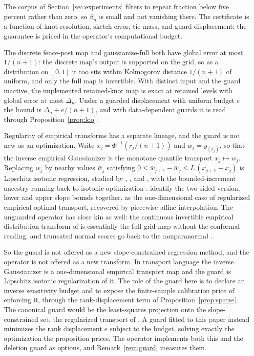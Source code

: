 \documentclass[11pt]{article}
\theoremstyle{remark}
\begin{document}
The corpus of Section~\ref{sec:experiments} filters to repeat fraction below five
percent rather than zero, so $\beta_n$ is small and not vanishing there. The certificate is a function of knot resolution, sketch error, tie mass, and
guard displacement: the guarantee is priced in the operator's computational
budget.

The discrete fence-post map and gaussianize-full both have global error at most
$1/(n+1)$: the discrete map's output is supported on the grid, so as a distribution on
$[0,1]$ it too sits within Kolmogorov distance $1/(n+1)$ of uniform, and only the full
map is invertible. With distinct input and the guard inactive, the implemented retained-knot map is
exact at retained levels with global error at most $\Delta_n$. Under a guarded
displacement with uniform budget $e$ the bound is $\Delta_n + e/(n+1)$, and with
data-dependent guards it is read through Proposition~\ref{prop:loo}.

Regularity of empirical transforms has a separate lineage, and the guard is not new
as an optimization. Write $x_j = \Phi^{-1}(r_j/(n+1))$ and $w_j = y_{(r_j)}$, so
that the inverse empirical Gaussianizer is the monotone quantile transport
$x_j \mapsto w_j$. Replacing $w_j$ by nearby values $\bar w_j$ satisfying
$0 \le \bar w_{j+1} - \bar w_j \le L\,(x_{j+1} - x_j)$ is Lipschitz isotonic
regression, studied by \citet{yeganova2009isotonic}, \citet{agarwal2010lipschitz},
and \citet{kakade2011efficient}, with the bounded-increment ancestry running back to
isotonic optimization \citep{jewell1975isotonic}. \citet{paty2020regularity}
identify the two-sided version, lower and upper slope bounds together, as the
one-dimensional case of regularized empirical optimal transport, recovered by
piecewise-affine interpolation. The unguarded operator has close kin as well: the
continuous invertible empirical distribution transform of
\citet{harar2022redistributor} is essentially the full-grid map without the
conformal reading, and truncated normal scores go back to the nonparanormal
\citep{liu2009nonparanormal}.

So the guard is not offered as a new slope-constrained regression method, and the
operator is not offered as a new transform. In transport language the inverse
Gaussianizer is a one-dimensional empirical transport map and the guard is Lipschitz
isotonic regularization of it. The role of the guard here is to declare an inverse
sensitivity budget and to expose the finite-sample calibration price of enforcing it,
through the rank-displacement term of Proposition~\ref{prop:sparse}. The canonical guard would be the least-squares projection onto
the slope-constrained set, the regularized transport of \citet{paty2020regularity}.
A guard fitted to this paper instead minimizes the rank displacement $e$ subject to
the budget, solving exactly the optimization the proposition prices. The operator
implements both this and the deletion guard as options, and
Remark~\ref{rem:guard} measures them.
\end{document}
